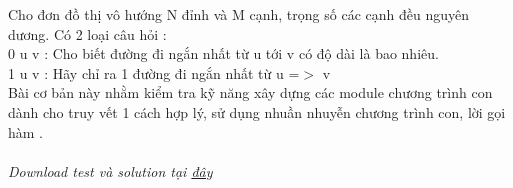 Cho đơn đồ thị vô hướng N đỉnh và M cạnh, trọng số các cạnh đều nguyên dương. Có 2 loại câu hỏi :   
\\   0 u v : Cho biết đường đi ngắn nhất từ u tới v có độ dài là bao nhiêu.   
\\   1 u v : Hãy chỉ ra 1 đường đi ngắn nhất từ u =$>$ v   
\\   Bài cơ bản này nhằm kiểm tra kỹ năng xây dựng các module chương trình con dành cho truy vết 1 cách hợp lý, sử dụng nhuần nhuyễn chương trình con, lời gọi hàm .   
\\
\\\textit{    Download test và solution tại    \href{http://vn.spoj.pl/content/floyd.rar}{     đây    }}